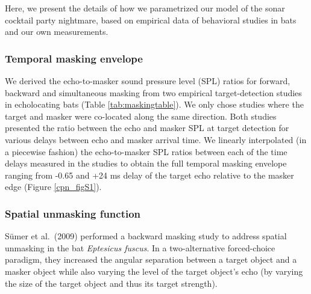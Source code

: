 \documentclass[
]{book}
\begin{document}
Here, we present the details of how we parametrized our model of the sonar cocktail party nightmare, based on empirical data of behavioral studies in bats and our own measurements.

\hypertarget{temporal-masking-envelope}{%
\subsubsection{\texorpdfstring{Temporal masking envelope \label{cpn_tempmasking}}{Temporal masking envelope }}\label{temporal-masking-envelope}}

We derived the echo-to-masker sound pressure level (SPL) ratios for forward, backward and simultaneous masking from two empirical target-detection studies in echolocating bats (Table \ref{tab:maskingtable}). We only chose studies where the target and masker were co-located along the same direction. Both studies presented the ratio between the echo and masker SPL at target detection for various delays between
echo and masker arrival time. We linearly interpolated (in a piecewise fashion) the echo-to-masker SPL ratios between each of the time delays measured in the studies to obtain the full temporal masking envelope ranging from -0.65 and +24 ms delay of the target echo relative to the masker edge (Figure \ref{cpn_figS1}).

\hypertarget{spatial-unmasking-function}{%
\subsubsection{\texorpdfstring{Spatial unmasking function \label{cpn_spatiunmasking}}{Spatial unmasking function }}\label{spatial-unmasking-function}}

Sümer et al.~(2009) performed a backward masking study to address spatial unmasking in the bat \emph{Eptesicus fuscus}. In a two-alternative forced-choice paradigm, they increased the angular separation between a target object and a masker object while also varying the level of the target object's echo (by varying the size of the target object and thus its target strength).
\end{document}
